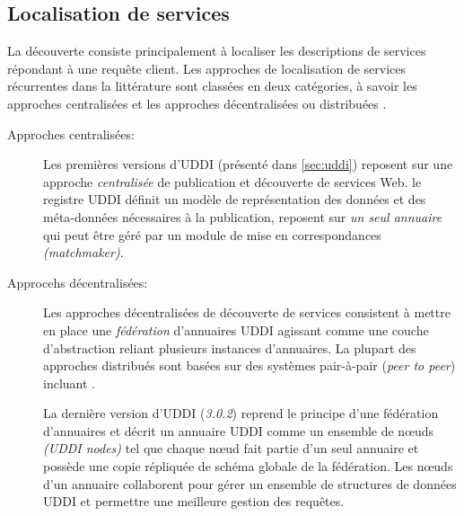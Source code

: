 \subsection{Localisation de services}
\label{sec:ws-localisation}
  La découverte consiste principalement à localiser les descriptions
  de services répondant à une requête client. Les approches de
  localisation de services récurrentes dans la littérature sont
  classées en deux catégories, à savoir les approches centralisées et
  les approches décentralisées ou distribuées
  \cite{garofalakis2004web}.

  \renewcommand{\descriptionlabel}[1]{\hspace{0.1cm}\textbullet~\textsf{#1}}
  \begin{description}
  \item [Approches centralisées:] Les premières versions
    d'\textsc{UDDI} \cite{clement2004uddi} (présenté dans
    \ref{sec:uddi}) reposent sur une approche \textit{centralisée} de
    publication et découverte de services Web. le registre
    \textsc{UDDI} définit un modèle de représentation des données et
    des méta-données nécessaires à la publication, reposent sur
    \textit{un seul annuaire} qui peut être géré par un module de mise
    en correspondances \textit{(matchmaker)}.

  \item [Approcehs décentralisées:] Les approches décentralisées de
    découverte de services \cite{rompothong2003query,
      sivashanmugam2004discovery, paolucci2003using, schmidt2004peer,
      verma2005meteor, sahin2005spider} consistent à mettre en place
    une \textit{fédération} d'annuaires \textsc{UDDI} agissant comme
    une couche d'abstraction reliant plusieurs instances
    d'annuaires. La plupart des approches distribués sont basées sur
    des systèmes pair-à-pair (\textit{peer to peer}) incluant
    \cite{schmidt2004peer, verma2005meteor, sahin2005spider}.

    La dernière version d'\textsc{UDDI} \cite{oasis2005specification}
    (\textit{3.0.2}) reprend le principe d'une fédération d'annuaires
    et décrit un annuaire \textsc{UDDI} comme un ensemble de nœuds
    \textit{(UDDI nodes)} tel que chaque nœud fait partie d'un seul
    annuaire et possède une copie répliquée de schéma globale de la
    fédération. Les nœuds d'un annuaire collaborent pour gérer un
    ensemble de structures de données \textsc{UDDI} et permettre une
    meilleure gestion des requêtes.
  \end{description}


